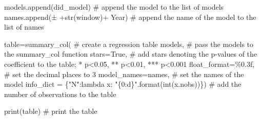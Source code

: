 \documentclass[
  letterpaper,
  DIV=11,
  numbers=noendperiod]{scrreprt}
\newenvironment{Shaded}{\begin{snugshade}}{\end{snugshade}}
\newcommand{\BuiltInTok}[1]{\textcolor[rgb]{0.00,0.23,0.31}{#1}}
\newcommand{\CommentTok}[1]{\textcolor[rgb]{0.37,0.37,0.37}{#1}}
\newcommand{\KeywordTok}[1]{\textcolor[rgb]{0.00,0.23,0.31}{#1}}
\newcommand{\NormalTok}[1]{\textcolor[rgb]{0.00,0.23,0.31}{#1}}
\newcommand{\OperatorTok}[1]{\textcolor[rgb]{0.37,0.37,0.37}{#1}}
\newcommand{\SpecialCharTok}[1]{\textcolor[rgb]{0.37,0.37,0.37}{#1}}
\newcommand{\StringTok}[1]{\textcolor[rgb]{0.13,0.47,0.30}{#1}}
\newcommand{\VariableTok}[1]{\textcolor[rgb]{0.07,0.07,0.07}{#1}}
\begin{document}
\begin{Shaded}
\begin{Highlighting}[]
\NormalTok{    models.append(did\_model) }\CommentTok{\# append the model to the list of models}
\NormalTok{    names.append(}\StringTok{\textquotesingle{}± \textquotesingle{}}\OperatorTok{+}\BuiltInTok{str}\NormalTok{(window)}\OperatorTok{+}\StringTok{\textquotesingle{} Year\textquotesingle{}}\NormalTok{) }\CommentTok{\# append the name of the model to the list of names}

\NormalTok{table}\OperatorTok{=}\NormalTok{summary\_col( }\CommentTok{\# create a regression table }
\NormalTok{    models, }\CommentTok{\# pass the models to the summary\_col function}
\NormalTok{    stars}\OperatorTok{=}\VariableTok{True}\NormalTok{, }\CommentTok{\# add stars denoting the p{-}values of the coefficient to the table; * p\textless{}0.05, ** p\textless{}0.01, *** p\textless{}0.001}
\NormalTok{    float\_format}\OperatorTok{=}\StringTok{\textquotesingle{}}\SpecialCharTok{\%0.3f}\StringTok{\textquotesingle{}}\NormalTok{, }\CommentTok{\# set the decimal places to 3}
\NormalTok{    model\_names}\OperatorTok{=}\NormalTok{names, }\CommentTok{\# set the names of the model}
\NormalTok{    info\_dict }\OperatorTok{=}\NormalTok{ \{}\StringTok{"N"}\NormalTok{:}\KeywordTok{lambda}\NormalTok{ x: }\StringTok{"}\SpecialCharTok{\{0:d\}}\StringTok{"}\NormalTok{.}\BuiltInTok{format}\NormalTok{(}\BuiltInTok{int}\NormalTok{(x.nobs))\}) }\CommentTok{\# add the number of observations to the table}

\BuiltInTok{print}\NormalTok{(table) }\CommentTok{\# print the table}
\end{Highlighting}
\end{Shaded}
\end{document}
